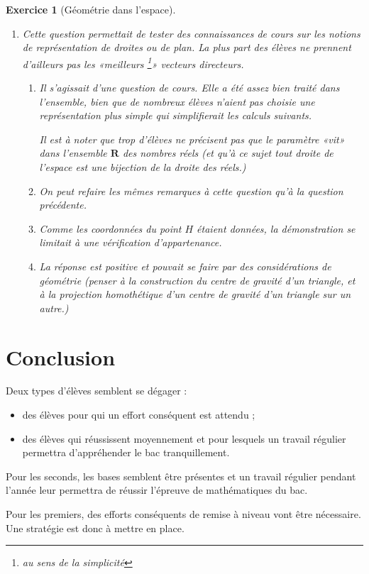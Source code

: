 \documentclass[12pt,a4paper]{article}
\theoremstyle{break}
\theoremstyle{nobreak}
\newtheorem{exercice}{Exercice}
\theoremstyle{nonumberplain}
\newcommand{\R}{\mathbf{R}}
\begin{document}
\begin{exercice}[Géométrie dans l'espace]
\begin{enumerate}
\begin{enumerate}
          L'interprétation en tant que points coplanaires n'a que peu
          été traitée.
        \item Le point $G$ était défini partout comme un isobarycentre,
          notion qui n'est désormais plus au programme. On trouvait
          néanmoins que $G$ était le milieu du sagement $[KE]$ puis que
          $G$ était le centre de gravité du triangle $IJK$.
      \end{enumerate}
    \item Cette question permettait de tester des connaissances de cours
      sur les notions de représentation de droites ou de plan. La plus
      part des élèves ne prennent d'ailleurs pas les «meilleurs
      \footnote{au sens de la simplicité}» vecteurs directeurs.
      \begin{enumerate}
        \item Il s'agissait d'une question de cours. Elle a été assez
          bien traité dans l'ensemble, bien que de nombreux élèves
          n'aient pas choisie une représentation plus simple qui
          simplifierait les calculs suivants.

          Il est à noter que trop d'élèves ne précisent pas que le
          paramètre «vit» dans l'ensemble $\R$ des nombres réels (et
          qu'à ce sujet tout droite de l'espace est une bijection de la
          droite des réels.)
        \item On peut refaire les mêmes remarques à cette question qu'à
          la question précédente.
        \item Comme les coordonnées du point $H$ étaient données, la
          démonstration se limitait à une vérification d'appartenance.
        \item La réponse est positive et pouvait se faire par des
          considérations de géométrie (penser à la construction du
          centre de gravité d'un triangle, et à la projection
          homothétique d'un centre de gravité d'un triangle sur un
          autre.)
      \end{enumerate}
  \end{enumerate}
\end{exercice}

\section*{Conclusion}

Deux types d'élèves semblent se dégager :
\begin{itemize}
  \item des élèves pour qui un effort conséquent est attendu ;
  \item des élèves qui réussissent moyennement et pour lesquels un
      travail régulier permettra d'appréhender le bac tranquillement.
\end{itemize}

Pour les seconds, les bases semblent être présentes et un travail
régulier pendant l'année leur permettra de réussir l'épreuve de
mathématiques du bac.

Pour les premiers, des efforts conséquents de remise à niveau vont être
nécessaire. Une stratégie est donc à mettre en place.
\end{document}
